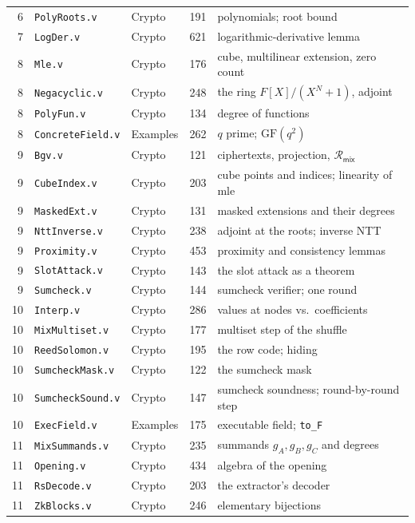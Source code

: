 \documentclass[11pt,a4paper]{article}
\newcommand{\Rmix}{\mathcal{R}_{\mathsf{mix}}}
\theoremstyle{definition}
\theoremstyle{plain}
\begin{document}
{\begin{longtable}{@{}rlp{}rp{}@{}}
6 & \texttt{PolyRoots.v} & Crypto & 191 & polynomials; root bound\\
7 & \texttt{LogDer.v} & Crypto & 621 & logarithmic-derivative lemma\\
8 & \texttt{Mle.v} & Crypto & 176 & cube, multilinear extension, zero count\\
8 & \texttt{Negacyclic.v} & Crypto & 248 & the ring $F[X]/(X^N+1)$, adjoint\\
8 & \texttt{PolyFun.v} & Crypto & 134 & degree of functions\\
8 & \texttt{ConcreteField.v} & Examples & 262 & $q$ prime; $\mathrm{GF}(q^2)$\\
9 & \texttt{Bgv.v} & Crypto & 121 & ciphertexts, projection, $\Rmix$\\
9 & \texttt{CubeIndex.v} & Crypto & 203 & cube points and indices; linearity of mle\\
9 & \texttt{MaskedExt.v} & Crypto & 131 & masked extensions and their degrees\\
9 & \texttt{NttInverse.v} & Crypto & 238 & adjoint at the roots; inverse NTT\\
9 & \texttt{Proximity.v} & Crypto & 453 & proximity and consistency lemmas\\
9 & \texttt{SlotAttack.v} & Crypto & 143 & the slot attack as a theorem\\
9 & \texttt{Sumcheck.v} & Crypto & 144 & sumcheck verifier; one round\\
10 & \texttt{Interp.v} & Crypto & 286 & values at nodes vs.\ coefficients\\
10 & \texttt{MixMultiset.v} & Crypto & 177 & multiset step of the shuffle\\
10 & \texttt{ReedSolomon.v} & Crypto & 195 & the row code; hiding\\
10 & \texttt{SumcheckMask.v} & Crypto & 122 & the sumcheck mask\\
10 & \texttt{SumcheckSound.v} & Crypto & 147 & sumcheck soundness; round-by-round step\\
10 & \texttt{ExecField.v} & Examples & 175 & executable field; \texttt{to\_F}\\
11 & \texttt{MixSummands.v} & Crypto & 235 & summands $g_A,g_B,g_C$ and degrees\\
11 & \texttt{Opening.v} & Crypto & 434 & algebra of the opening\\
11 & \texttt{RsDecode.v} & Crypto & 203 & the extractor's decoder\\
11 & \texttt{ZkBlocks.v} & Crypto & 246 & elementary bijections\\

\end{longtable}}
\end{document}
